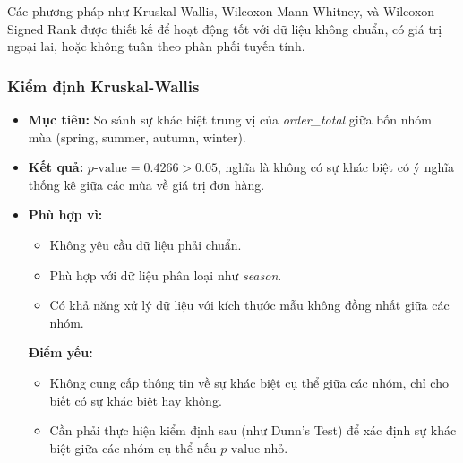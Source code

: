Các phương pháp như Kruskal-Wallis, Wilcoxon-Mann-Whitney, và Wilcoxon Signed Rank được thiết kế để hoạt động tốt với dữ liệu không chuẩn, có giá trị ngoại lai, hoặc không tuân theo phân phối tuyến tính.

\subsubsection{Kiểm định Kruskal-Wallis}
\begin{itemize}
    \item \textbf{Mục tiêu:}  
    So sánh sự khác biệt trung vị của \textit{order\_total} giữa bốn nhóm mùa (spring, summer, autumn, winter).
    \item \textbf{Kết quả:}  
    $p\text{-value} = 0.4266 > 0.05$, nghĩa là không có sự khác biệt có ý nghĩa thống kê giữa các mùa về giá trị đơn hàng.
    \item \textbf{Phù hợp vì:}  
    \begin{itemize}
        \item Không yêu cầu dữ liệu phải chuẩn.
        \item Phù hợp với dữ liệu phân loại như \textit{season}.
        \item Có khả năng xử lý dữ liệu với kích thước mẫu không đồng nhất giữa các nhóm.
    \end{itemize}
    \textbf{Điểm yếu:}
\begin{itemize}
    \item Không cung cấp thông tin về sự khác biệt cụ thể giữa các nhóm, chỉ cho biết có sự khác biệt hay không.
    \item Cần phải thực hiện kiểm định sau (như Dunn’s Test) để xác định sự khác biệt giữa các nhóm cụ thể nếu $p\text{-value}$ nhỏ.
\end{itemize}

\end{itemize}

